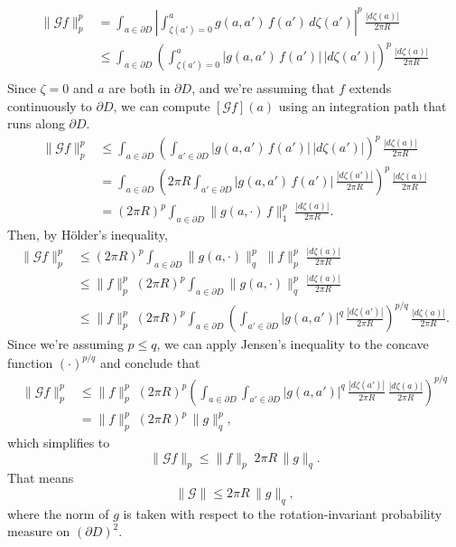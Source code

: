 \documentclass{article}
\theoremstyle{plain}
\begin{document}
\begin{align*}
\|\mathcal{G}f\|_p^p & = \int_{a \in \partial D} \left| \int_{\zeta(a') = 0}^{a} g(a, a')\,f(a')\,d\zeta(a') \right|^p\,\frac{|d\zeta(a)|}{2\pi R} \\
& \le \int_{a \in \partial D} \left( \int_{\zeta(a') = 0}^{a} |g(a, a')\,f(a')|\,|d\zeta(a')| \right)^p\,\frac{|d\zeta(a)|}{2\pi R} \\
\end{align*}
Since $\zeta = 0$ and $a$ are both in $\partial D$, and we're assuming that $f$ extends continuously to $\partial D$, we can compute $[\mathcal{G}f](a)$ using an integration path that runs along $\partial D$.
\begin{align*}
\|\mathcal{G}f\|_p^p & \le \int_{a \in \partial D} \left(\int_{a' \in \partial D} |g(a, a')\,f(a')|\,|d\zeta(a')| \right)^p\,\frac{|d\zeta(a)|}{2\pi R} \\
& = \int_{a \in \partial D} \left(2\pi R \int_{a' \in \partial D} |g(a, a')\,f(a')|\,\frac{|d\zeta(a')|}{2\pi R} \right)^p\,\frac{|d\zeta(a)|}{2\pi R} \\
& = (2\pi R)^p \int_{a \in \partial D} \|g(a, \cdot)\,f\|_1^p\;\frac{|d\zeta(a)|}{2\pi R}.
\end{align*}
Then, by H\"{o}lder's inequality,
\begin{align*}
\|\mathcal{G}f\|_p^p & \le (2\pi R)^p \int_{a \in \partial D} \|g(a, \cdot)\|_q^p\;\|f\|_p^p\;\frac{|d\zeta(a)|}{2\pi R} \\
& \le \|f\|_p^p\;(2\pi R)^p \int_{a \in \partial D} \|g(a, \cdot)\|_q^p\;\frac{|d\zeta(a)|}{2\pi R} \\
& \le \|f\|_p^p\;(2\pi R)^p \int_{a \in \partial D} \left( \int_{a' \in \partial D} |g(a, a')|^q\,\frac{|d\zeta(a')|}{2\pi R} \right)^{p/q}\,\frac{|d\zeta(a)|}{2\pi R}.
\end{align*}
Since we're assuming $p \le q$, we can apply Jensen's inequality to the concave function $(\cdot)^{p/q}$ and conclude that
\begin{align*}
\|\mathcal{G}f\|_p^p & \le \|f\|_p^p\;(2\pi R)^p \left( \int_{a \in \partial D} \int_{a' \in \partial D} |g(a, a')|^q\,\frac{|d\zeta(a')|}{2\pi R}\,\frac{|d\zeta(a)|}{2\pi R} \right)^{p/q} \\
& = \|f\|_p^p\;(2\pi R)^p\,\|g\|_q^p,
\end{align*}
which simplifies to
\[ \|\mathcal{G}f\|_p \le \|f\|_p\;2\pi R\,\|g\|_q. \]
That means
\[ \|\mathcal{G}\| \le 2\pi R\,\|g\|_q, \]
where the norm of $g$ is taken with respect to the rotation-invariant probability measure on $(\partial D)^2$.
\end{document}

